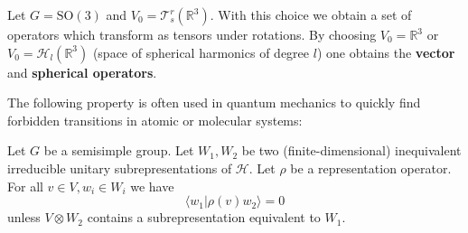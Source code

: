 	\begin{example}
		Let $G=\text{SO}(3)$ and $V_0=\mathcal{T}^r_s(\mathbb{R}^3)$. With this choice we obtain a set of operators which transform as tensors under rotations. By choosing $V_0=\mathbb{R}^3$ or $V_0=\mathcal{H}_l(\mathbb{R}^3)$ (space of spherical harmonics of degree $l$) one obtains the \textbf{vector} and \textbf{spherical operators}.
	\end{example}
	
	The following property is often used in quantum mechanics to quickly find forbidden transitions in atomic or molecular systems:
        \begin{property}
        	Let $G$ be a semisimple group. Let $W_1, W_2$ be two (finite-dimensional) inequivalent irreducible unitary subrepresentations of $\mathcal{H}$. Let $\rho$ be a representation operator. For all $v\in V, w_i\in W_i$ we have
        	\begin{equation}
        		\langle w_1|\rho(v)w_2\rangle = 0
        	\end{equation}
        	unless $V\otimes W_2$ contains a subrepresentation equivalent to $W_1$.
        \end{property}
	
